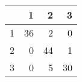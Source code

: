 \begin{tabular}{rrrr}
  \hline
 & 1 & 2 & 3 \\ 
  \hline
1 &  36 &   2 &   0 \\ 
  2 &   0 &  44 &   1 \\ 
  3 &   0 &   5 &  30 \\ 
   \hline
\end{tabular}
